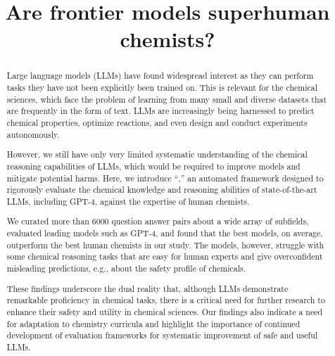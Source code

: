 \documentclass[11pt, oneside]{article}
\title{\textsf{Are frontier models superhuman chemists?}}
\begin{document}
\maketitle

\begin{abstract}
    Large language models (LLMs) have found widespread interest as they can perform tasks they have not been explicitly been trained on. 
    This is relevant for the chemical sciences, which face the problem of learning from many small and diverse datasets that are frequently in the form of text.
    LLMs are increasingly being harnessed to predict chemical properties, optimize reactions, and even design and conduct experiments autonomously.

    However, we still have only very limited systematic understanding of the chemical reasoning capabilities of LLMs, which would be required to improve models and mitigate potential harms. 
    Here, we introduce \enquote{\chembench,} an automated framework designed to rigorously evaluate the chemical knowledge and reasoning abilities of state-of-the-art LLMs, including GPT-4, against the expertise of human chemists.

    We curated more than 6000 question answer pairs about a wide array of subfields, evaluated leading models such as GPT-4, and found that the best models, on average, outperform the best human chemists in our study. 
    The models, however, struggle with some chemical reasoning tasks that are easy for human experts and give overconfident misleading predictions, e.g., about the safety profile of chemicals. 

    These findings underscore the dual reality that, although LLMs demonstrate remarkable proficiency in chemical tasks, there is a critical need for further research to enhance their safety and utility in chemical sciences.
    Our findings also indicate a need for adaptation to chemistry curricula and highlight the importance of continued development of evaluation frameworks for systematic improvement of safe and useful LLMs.
\end{abstract}

\clearpage
\end{document}
